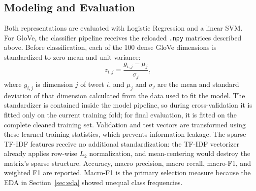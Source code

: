 \subsection{Modeling and Evaluation}

Both representations are evaluated with Logistic Regression and a linear SVM. For GloVe,
the classifier pipeline receives the reloaded \texttt{.npy} matrices described above.
Before classification, each of the 100 dense GloVe dimensions is standardized
to zero mean and unit variance:
\[
z_{i,j}=\frac{g_{i,j}-\mu_j}{\sigma_j},
\]
where $g_{i,j}$ is dimension $j$ of tweet $i$, and $\mu_j$ and $\sigma_j$ are
the mean and standard deviation of that dimension calculated from the data used
to fit the model. The standardizer is contained inside the model pipeline, so
during cross-validation it is fitted only on the current training fold; for
final evaluation, it is fitted on the complete cleaned training set. Validation
and test vectors are transformed using these learned training statistics, which
prevents information leakage. The sparse TF-IDF features receive no additional
standardization: the TF-IDF vectorizer already applies row-wise $L_2$
normalization, and mean-centering would destroy the matrix's sparse structure.
Accuracy, macro precision, macro recall, macro-F1, and weighted F1 are reported. 
Macro-F1 is the primary selection measure because the EDA in Section~\ref{sec:eda} showed unequal class frequencies.



